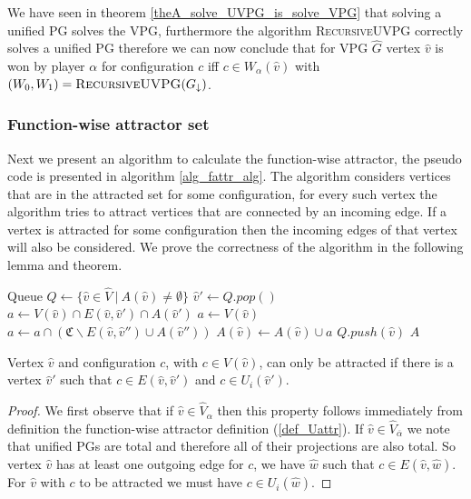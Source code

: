 We have seen in theorem \ref{theA_solve_UVPG_is_solve_VPG} that solving a unified PG solves the VPG, furthermore the algorithm \textsc{RecursiveUVPG} correctly solves a unified PG therefore we can now conclude that for VPG $\hat{G}$ vertex $\hat{v}$ is won by player $\alpha$ for configuration $c$ iff $c \in W_\alpha(\hat{v})$ with $(W_0,W_1) = \textsc{RecursiveUVPG}(G_{\downarrow})$.

\subsubsection{Function-wise attractor set}
Next we present an algorithm to calculate the function-wise attractor, the pseudo code is presented in algorithm \ref{alg_fattr_alg}. The algorithm considers vertices that are in the attracted set for some configuration, for every such vertex the algorithm tries to attract vertices that are connected by an incoming edge. If a vertex is attracted for some configuration then the incoming edges of that vertex will also be considered. We prove the correctness of the algorithm in the following lemma and theorem.
\begin{algorithm}
	\caption{$\textsc{$\alpha$-FAttractor}(G, A : \hat{V} \rightarrow 2^\mathfrak{C})$}\label{alg_fattr_alg}
	\begin{algorithmic}[1]
		\State Queue $Q \gets \{\hat{v} \in \hat{V} \ |\ A(\hat{v}) \neq \emptyset  \}$
		\State $\hat{v}' \gets Q.pop()$
				\State $a \gets V(\hat{v}) \cap E(\hat{v},\hat{v}') \cap A(\hat{v}')$
			\Else
				\State $a \gets V(\hat{v})$
					\State $a \gets a \cap (\mathfrak{C}\backslash E(\hat{v},\hat{v}'') \cup A(\hat{v}''))$
				\EndFor
			\EndIf
				\State $A(\hat{v}) \gets A(\hat{v}) \cup a$
				\State $Q.push(\hat{v})$
			\EndIf
		\EndFor
		\EndWhile
		\State \Return $A$
	\end{algorithmic}
\end{algorithm}
\begin{lemma}
\label{lem_attr_requires_E}
Vertex $\hat{v}$ and configuration $c$, with $c \in V(\hat{v})$, can only be attracted if there is a vertex $\hat{v}'$ such that $c \in E(\hat{v}, \hat{v}')$ and $c \in U_i(\hat{v}')$.
	\begin{proof}
		We first observe that if $\hat{v} \in \hat{V}_\alpha$ then this property follows immediately from definition the function-wise attractor definition (\ref{def_Uattr}). If $\hat{v} \in \hat{V}_{\overline{\alpha}}$ we note that unified PGs are total and therefore all of their projections are also total. So vertex $\hat{v}$ has at least one outgoing edge for $c$, we have $\hat{w}$ such that $c \in E(\hat{v},\hat{w})$. For $\hat{v}$ with $c$ to be attracted we must have $c \in U_i(\hat{w})$.
	\end{proof}
\end{lemma}
